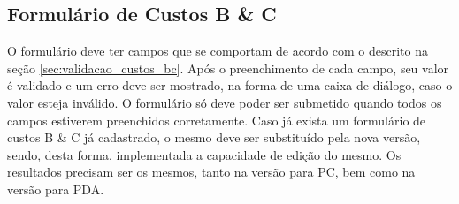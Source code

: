\subsection{Formulário de Custos B \& C}
\label{sec:metodo_custos_bc}

O formulário deve ter campos que se comportam de acordo com o descrito na seção \ref{sec:validacao_custos_bc}. Após o preenchimento de cada campo, seu valor é validado e um erro deve ser mostrado, na forma de uma caixa de diálogo, caso o valor esteja inválido. O formulário só deve poder ser submetido quando todos os campos estiverem preenchidos corretamente. Caso já exista um formulário de custos B \& C já cadastrado, o mesmo deve ser substituído pela nova versão, sendo, desta forma, implementada a capacidade de edição do mesmo. Os resultados precisam ser os mesmos, tanto na versão para PC, bem como na versão para PDA.

